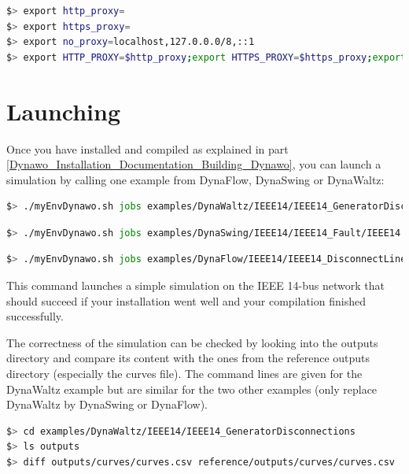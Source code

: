\documentclass[a4paper, 12pt]{report}
\begin{document}
\begin{lstlisting}[language=bash]
$> export http_proxy=
$> export https_proxy=
$> export no_proxy=localhost,127.0.0.0/8,::1
$> export HTTP_PROXY=$http_proxy;export HTTPS_PROXY=$https_proxy;export NO_PROXY=$no_proxy;
\end{lstlisting}

\section[Launching Dynawo]{Launching \Dynawo}

Once you have installed and compiled \Dynawo as explained in part \ref{Dynawo_Installation_Documentation_Building_Dynawo}, you can launch a simulation by calling one example from DynaFlow, DynaSwing or DynaWaltz:

\begin{lstlisting}[language=bash, breaklines=true, breakatwhitespace=false]
$> ./myEnvDynawo.sh jobs examples/DynaWaltz/IEEE14/IEEE14_GeneratorDisconnections/IEEE14.jobs
\end{lstlisting}

\begin{lstlisting}[language=bash, breaklines=true, breakatwhitespace=false]
$> ./myEnvDynawo.sh jobs examples/DynaSwing/IEEE14/IEEE14_Fault/IEEE14.jobs
\end{lstlisting}

\begin{lstlisting}[language=bash, breaklines=true, breakatwhitespace=false]
$> ./myEnvDynawo.sh jobs examples/DynaFlow/IEEE14/IEEE14_DisconnectLine/IEEE14.jobs
\end{lstlisting}

This command launches a simple simulation on the IEEE 14-bus network that should succeed if your installation went well and your compilation finished successfully.

The correctness of the simulation can be checked by looking into the outputs directory and compare its content with the ones from the reference outputs directory (especially the curves file). The command lines are given for the DynaWaltz example but are similar for the two other examples (only replace DynaWaltz by DynaSwing or DynaFlow).

\begin{lstlisting}[language=bash, breaklines=true, breakatwhitespace=false]
$> cd examples/DynaWaltz/IEEE14/IEEE14_GeneratorDisconnections
$> ls outputs
$> diff outputs/curves/curves.csv reference/outputs/curves/curves.csv
\end{lstlisting}
\end{document}
